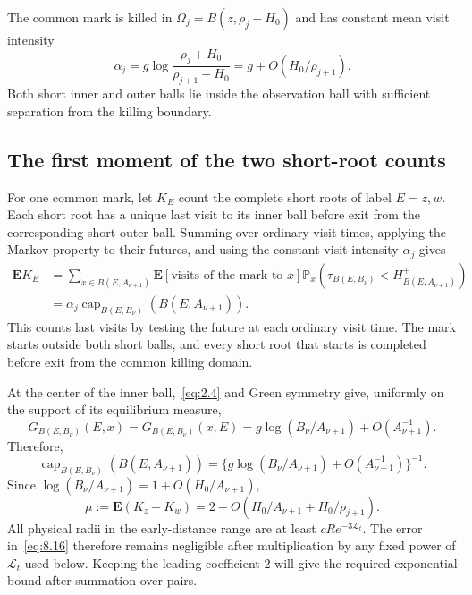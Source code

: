 \documentclass[11pt,a4paper]{article}
\numberwithin{equation}{section}
\theoremstyle{remark}
\begin{document}
The common mark is killed in $\Omega_j=B(z,\rho_j+H_0)$ and has constant mean visit intensity
\begin{equation}\label{eq:8.13}
\alpha_j=g\log\frac{\rho_j+H_0}{\rho_{j+1}-H_0}=g+O(H_0/\rho_{j+1}).
\end{equation}
Both short inner and outer balls lie inside the observation ball with sufficient separation from the killing boundary.

\subsection{The first moment of the two short-root counts}\label{sec:rootmean}
For one common mark, let $K_E$ count the complete short roots of label $E=z,w$. Each short root has a unique last visit to its inner ball before exit from the corresponding short outer ball. Summing over ordinary visit times, applying the Markov property to their futures, and using the constant visit intensity $\alpha_j$ gives
\begin{equation}\label{eq:8.14}
\begin{split}
\mathbf EK_E
&=\sum_{x\in B(E,A_{\nu+1})}\mathbf E[\text{visits of the mark to }x\text{}]
\mathbb P_x(\tau_{B(E,B_{\nu})}<H_{B(E,A_{\nu+1})}^+)\\
&=\alpha_j\operatorname{cap}_{B(E,B_{\nu})}(B(E,A_{\nu+1})).
\end{split}
\end{equation}
This counts last visits by testing the future at each ordinary visit time. The mark starts outside both short balls, and every short root that starts is completed before exit from the common killing domain.

At the center of the inner ball,~\eqref{eq:2.4} and Green symmetry give, uniformly on the support of its equilibrium measure,
\[
G_{B(E,B_\nu)}(E,x)
=G_{B(E,B_\nu)}(x,E)
=g\log(B_\nu/A_{\nu+1})+O(A_{\nu+1}^{-1}).
\]
Therefore,
\begin{equation}\label{eq:8.15}
\operatorname{cap}_{B(E,B_{\nu})}(B(E,A_{\nu+1}))
=\{g\log(B_{\nu}/A_{\nu+1})+O(A_{\nu+1}^{-1})\}^{-1}.
\end{equation}
Since $\log(B_\nu/A_{\nu+1})=1+O(H_0/A_{\nu+1})$,
\begin{equation}\label{eq:8.16}
\mu:=\mathbf E(K_z+K_w)
=2+O(H_0/A_{\nu+1}+H_0/\rho_{j+1}).
\end{equation}
All physical radii in the early-distance range are at least $cRe^{-3\mathcal L_t}$. The error in~\eqref{eq:8.16} therefore remains negligible after multiplication by any fixed power of $\mathcal L_t$ used below. Keeping the leading coefficient $2$ will give the required exponential bound after summation over pairs.
\end{document}
